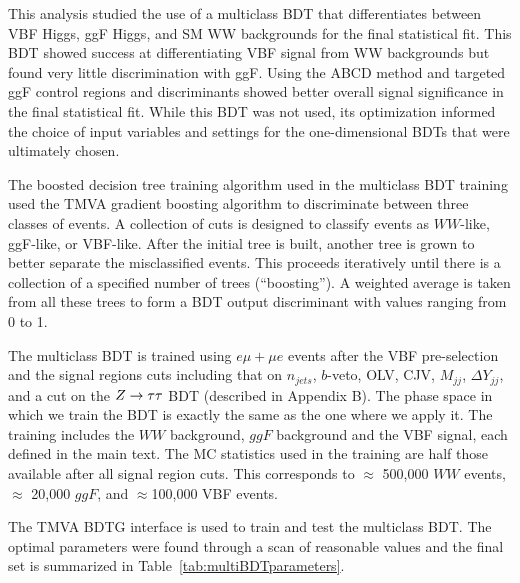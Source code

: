 
This analysis studied the use of a multiclass BDT that differentiates between VBF Higgs, ggF Higgs, and SM WW backgrounds for the final statistical fit. This BDT showed success at differentiating VBF signal from WW backgrounds but found very little discrimination with ggF. Using the ABCD method and targeted ggF control regions and discriminants showed better overall signal significance in the final statistical fit. While this BDT was not used, its optimization informed the choice of input variables and settings for the one-dimensional BDTs that were ultimately chosen. 

The boosted decision tree training algorithm used in the multiclass BDT training used the TMVA gradient boosting algorithm to discriminate between three classes of events. A collection of cuts is designed to classify events as $WW$-like, ggF-like, or VBF-like. After the initial tree is built, another tree is grown to better separate the misclassified events. This proceeds iteratively until there is a collection of a specified number of trees (``boosting''). A weighted average is taken from all these trees to form a BDT output discriminant with values ranging from 0 to 1.

The multiclass BDT is trained using $e\mu+\mu e$ events after the VBF pre-selection and the signal regions cuts including that on $n_{jets}$, $b$-veto, OLV, CJV, $M_{jj}$, $\Delta Y_{jj}$, and a cut on the $Z\rightarrow\tau\tau$ BDT (described in Appendix B). The phase space in which we train the BDT is exactly the same as the one where we apply it. The training includes the $WW$ background, $ggF$ background and the VBF signal, each defined in the main text. The MC statistics used in the training are half those available after all signal region cuts. This corresponds to $\approx$ 500,000 $WW$ events, $\approx$ 20,000 $ggF$, and $\approx$100,000 VBF events.

The TMVA BDTG interface is used to train and test the multiclass BDT. The optimal parameters were found through a scan of reasonable values and the final set is summarized in Table~\ref{tab:multiBDTparameters}.

